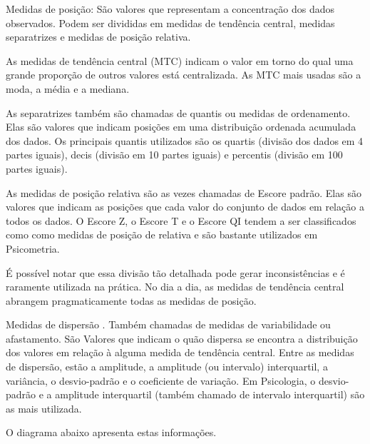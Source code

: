\documentclass[
]{book}
\begin{document}
Medidas de posição: São valores que representam a concentração dos dados observados. Podem ser divididas em medidas de tendência central, medidas separatrizes e medidas de posição relativa.

As medidas de tendência central (MTC) indicam o valor em torno do qual uma grande proporção de outros valores está centralizada. As MTC mais usadas são a moda, a média e a mediana.

As separatrizes também são chamadas de quantis ou medidas de ordenamento. Elas são valores que indicam posições em uma distribuição ordenada acumulada dos dados. Os principais quantis utilizados são os quartis (divisão dos dados em 4 partes iguais), decis (divisão em 10 partes iguais) e percentis (divisão em 100 partes iguais).

As medidas de posição relativa são as vezes chamadas de Escore padrão. Elas são valores que indicam as posições que cada valor do conjunto de dados em relação a todos os dados. O Escore Z, o Escore T e o Escore QI tendem a ser classificados como como medidas de posição de relativa e são bastante utilizados em Psicometria.

É possível notar que essa divisão tão detalhada pode gerar inconsistências e é raramente utilizada na prática. No dia a dia, as medidas de tendência central abrangem pragmaticamente todas as medidas de posição.

Medidas de dispersão . Também chamadas de medidas de variabilidade ou afastamento. São Valores que indicam o quão dispersa se encontra a distribuição dos valores em relação à alguma medida de tendência central. Entre as medidas de dispersão, estão a amplitude, a amplitude (ou intervalo) interquartil, a variância, o desvio-padrão e o coeficiente de variação. Em Psicologia, o desvio-padrão e a amplitude interquartil (também chamado de intervalo interquartil) são as mais utilizada.

O diagrama abaixo apresenta estas informações.
\end{document}
